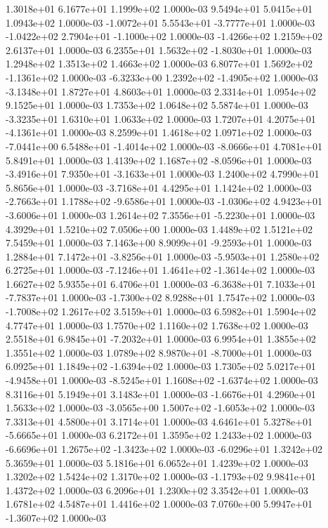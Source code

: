 1.3018e+01 6.1677e+01 1.1999e+02  1.0000e-03
9.5494e+01 5.0415e+01 1.0943e+02  1.0000e-03
-1.0072e+01  5.5543e+01 -3.7777e+01  1.0000e-03
-1.0422e+02  2.7904e+01 -1.1000e+02  1.0000e-03
-1.4266e+02  1.2159e+02  2.6137e+01  1.0000e-03
 6.2355e+01  1.5632e+02 -1.8030e+01  1.0000e-03
1.2948e+02 1.3513e+02 1.4663e+02  1.0000e-03
 6.8077e+01  1.5692e+02 -1.1361e+02  1.0000e-03
-6.3233e+00  1.2392e+02 -1.4905e+02  1.0000e-03
-3.1348e+01  1.8727e+01  4.8603e+01  1.0000e-03
2.3314e+01 1.0954e+02 9.1525e+01  1.0000e-03
1.7353e+02 1.0648e+02 5.5874e+01  1.0000e-03
-3.3235e+01  1.6310e+01  1.0633e+02  1.0000e-03
 1.7207e+01  4.2075e+01 -4.1361e+01  1.0000e-03
8.2599e+01 1.4618e+02 1.0971e+02  1.0000e-03
-7.0441e+00  6.5488e+01 -1.4014e+02  1.0000e-03
-8.0666e+01  4.7081e+01  5.8491e+01  1.0000e-03
 1.4139e+02  1.1687e+02 -8.0596e+01  1.0000e-03
-3.4916e+01  7.9350e+01 -3.1633e+01  1.0000e-03
1.2400e+02 4.7990e+01 5.8656e+01  1.0000e-03
-3.7168e+01  4.4295e+01  1.1424e+02  1.0000e-03
-2.7663e+01  1.1788e+02 -9.6586e+01  1.0000e-03
-1.0306e+02  4.9423e+01 -3.6006e+01  1.0000e-03
 1.2614e+02  7.3556e+01 -5.2230e+01  1.0000e-03
4.3929e+01 1.5210e+02 7.0506e+00  1.0000e-03
1.4489e+02 1.5121e+02 7.5459e+01  1.0000e-03
 7.1463e+00  8.9099e+01 -9.2593e+01  1.0000e-03
 1.2884e+01  7.1472e+01 -3.8256e+01  1.0000e-03
-5.9503e+01  1.2580e+02  6.2725e+01  1.0000e-03
-7.1246e+01  1.4641e+02 -1.3614e+02  1.0000e-03
1.6627e+02 5.9355e+01 6.4706e+01  1.0000e-03
-6.3638e+01  7.1033e+01 -7.7837e+01  1.0000e-03
-1.7300e+02  8.9288e+01  1.7547e+02  1.0000e-03
-1.7008e+02  1.2617e+02  3.5159e+01  1.0000e-03
6.5982e+01 1.5904e+02 4.7747e+01  1.0000e-03
1.7570e+02 1.1160e+02 1.7638e+02  1.0000e-03
 2.5518e+01  6.9845e+01 -7.2032e+01  1.0000e-03
6.9954e+01 1.3855e+02 1.3551e+02  1.0000e-03
 1.0789e+02  8.9870e+01 -8.7000e+01  1.0000e-03
 6.0925e+01  1.1849e+02 -1.6394e+02  1.0000e-03
 1.7305e+02  5.0217e+01 -4.9458e+01  1.0000e-03
-8.5245e+01  1.1608e+02 -1.6374e+02  1.0000e-03
8.3116e+01 5.1949e+01 3.1483e+01  1.0000e-03
-1.6676e+01  4.2960e+01  1.5633e+02  1.0000e-03
-3.0565e+00  1.5007e+02 -1.6053e+02  1.0000e-03
7.3313e+01 4.5800e+01 3.1714e+01  1.0000e-03
 4.6461e+01  5.3278e+01 -5.6665e+01  1.0000e-03
6.2172e+01 1.3595e+02 1.2433e+02  1.0000e-03
-6.6696e+01  1.2675e+02 -1.3423e+02  1.0000e-03
-6.0296e+01  1.3242e+02  5.3659e+01  1.0000e-03
5.1816e+01 6.0652e+01 1.4239e+02  1.0000e-03
1.3202e+02 1.5424e+02 1.3170e+02  1.0000e-03
-1.1793e+02  9.9841e+01  1.4372e+02  1.0000e-03
6.2096e+01 1.2300e+02 3.3542e+01  1.0000e-03
1.6781e+02 4.5487e+01 1.4416e+02  1.0000e-03
 7.0760e+00  5.9947e+01 -1.3607e+02  1.0000e-03

